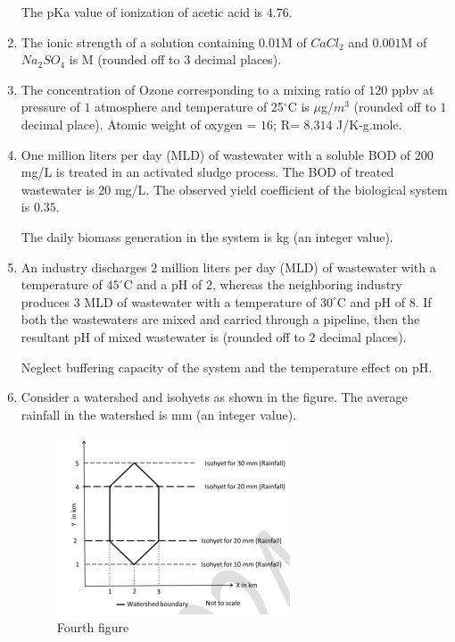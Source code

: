 \documentclass[journal]{IEEEtran}
\numberwithin{equation}{enumi}
\numberwithin{figure}{enumi}
\begin{document}
\begin{enumerate}[start=1, label={Q\arabic*.}]
\vspace{0.1cm}
The pKa value of ionization of acetic acid is $4.76$.

\vspace{0.1cm}
\item The ionic strength of a solution containing 0.01M of $CaCl_2$ and $0.001$M of $Na_2SO_4$ is \underline{\hspace{1.5cm}}M (rounded off to $3$ decimal places).
\newpage
\item The concentration of Ozone corresponding to a mixing ratio of $120$ ppbv at pressure of $1$
atmosphere and temperature of 25$^\circ$C is \underline{\hspace{1.5cm}} $\mu$g/$m^3$
(rounded off to $1$ decimal place).
Atomic weight of oxygen = $16$; R= $8.314$ J/K-g.mole.

\vspace{0.1cm}
\item One million liters per day (MLD) of wastewater with a soluble BOD of $200$ mg/L is
treated in an activated sludge process. The BOD of treated wastewater is $20$ mg/L. The
observed yield coefficient of the biological system is $0.35$.

\vspace{0.1cm}
The daily biomass generation in the system is \underline{\hspace{1.5cm}} kg (an integer value).

\vspace{0.1cm}
\item An industry discharges $2$ million liters per day (MLD) of wastewater with a temperature
of $45^\circ$C and a pH of $2$, whereas the neighboring industry produces $3$ MLD of wastewater
with a temperature of $30^\circ$C and pH of $8$. If both the wastewaters are mixed and carried
through a pipeline, then the resultant pH of mixed wastewater is \underline{\hspace{1.5cm}}(rounded off
to $2$ decimal places).

Neglect buffering capacity of the system and the temperature effect on pH.

\item Consider a watershed and isohyets as shown in the figure. The average rainfall in the
watershed is \underline{\hspace{1.5cm}} mm (an integer value).
\begin{figure}[H]
    \centering
    \includegraphics[width=0.4\linewidth]{figs/fig4.png}
    \caption{Fourth figure}
    \label{fig:fourth}
\end{figure}


\end{enumerate}
\end{document}
